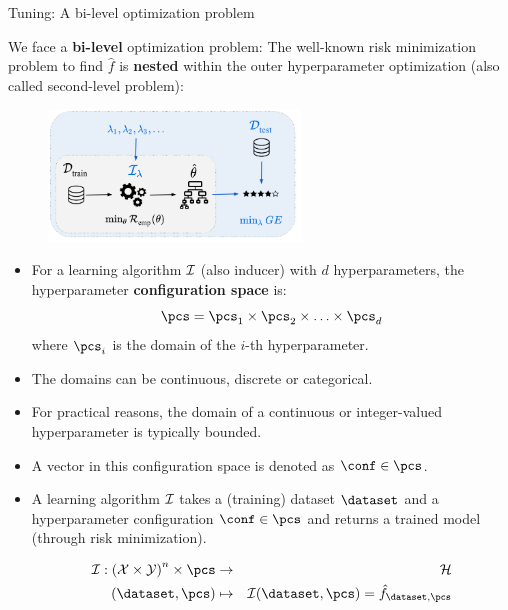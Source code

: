 \begin{frame}{Tuning: A bi-level optimization problem}

\vspace{0.2cm}

We face a \textbf{bi-level} optimization problem: The well-known risk minimization problem to find $\hat f$ is \textbf{nested} within the outer hyperparameter optimization (also called second-level problem):

\begin{center}
\begin{figure}
\includegraphics[width=0.6\textwidth]{images/riskmin_bilevel3.png}
\end{figure}
\end{center}

\framebreak

\begin{itemize}
\item For a learning algorithm $\mathcal{I}$ (also inducer) with $d$ hyperparameters, the hyperparameter \textbf{configuration space} is:
$$\pcs=\pcs_{1} \times \pcs_{2} \times \ldots \times \pcs_{d}$$
where $\pcs_{i}$ is the domain of the $i$-th hyperparameter.
\item The domains can be continuous, discrete or categorical.
\item For practical reasons, the domain of a continuous or integer-valued hyperparameter is typically bounded.
\item A vector in this configuration space is denoted as $\conf \in \pcs$.
\item A learning algorithm $\mathcal{I}$ takes a (training) dataset $\dataset$ and a hyperparameter configuration $\conf \in \pcs$ and returns a trained model (through risk minimization).

\vspace*{-0.2cm}
\begin{eqnarray*}
\inducer: \left(\mathcal{X} \times \mathcal{Y}\right)^n \times \pcs &\to& \mathcal{H} \\
(\dataset, \pcs) &\mapsto& \inducer(\dataset, \pcs) = \hat f_{\dataset, \pcs}
\end{eqnarray*}
\end{itemize}


\end{frame}
